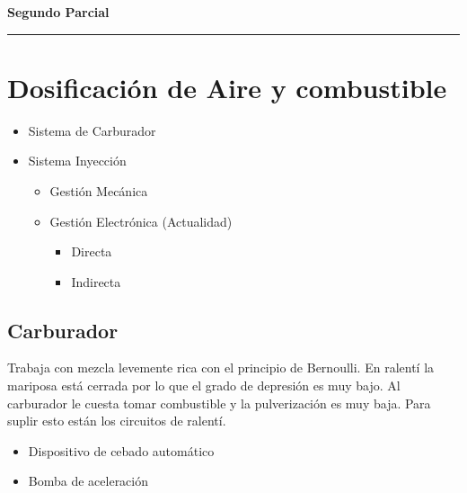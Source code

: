 
\vspace{.9cm}
{\centering 
{\bf \LARGE Segundo Parcial \par}
}
\begin{center}
\vspace{-.2cm}\rule{3cm}{2pt}\par
\vspace{-.2cm}
\end{center}

\section{Dosificación de Aire y combustible}
\begin{itemize}
    \item Sistema de Carburador
    \item Sistema Inyección
    \begin{itemize}
        \item Gestión Mecánica
        \item Gestión Electrónica (Actualidad)
        \begin{itemize}
            \item Directa
            \item Indirecta
        \end{itemize}
    \end{itemize}
\end{itemize}
\subsection*{Carburador}
Trabaja con mezcla levemente rica con el principio de Bernoulli. En ralentí la mariposa está cerrada por lo que el grado de depresión es muy bajo. Al carburador le cuesta tomar combustible y la pulverización es muy baja. Para suplir esto están los circuitos de ralentí.
\begin{itemize}
    \item Dispositivo de cebado automático
    \item Bomba de aceleración
\end{itemize}



